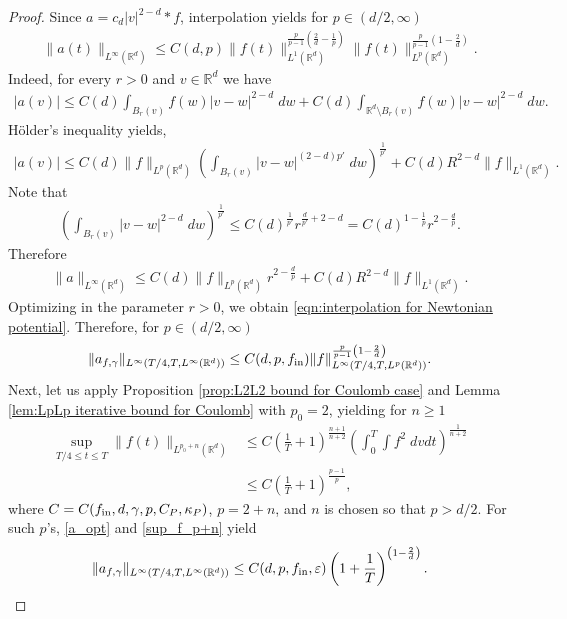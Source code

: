\documentclass[12pt,american]{amsart}
\numberwithin{equation}{section}
\theoremstyle{plain}
\theoremstyle{definition}                  %
\def\fin{f_{\textnormal{in}}}
\begin{document}
\begin{proof}
  Since $a = c_d|v|^{2-d} * f$, interpolation yields for $p\in (d/2,\infty)$
  \begin{align}\label{eqn:interpolation for Newtonian potential}
    \|a(t)\|_{L^\infty(\mathbb{R}^d)} \leq C(d,p)\|f(t)\|_{L^1(\mathbb{R}^d)}^{\frac{p}{p-1}\left ( \frac{2}{d}-\frac{1}{p} \right )}\|f(t)\|_{L^p(\mathbb{R}^d)}^{\frac{p}{p-1}\left ( 1- \frac{2}{d} \right )}.	
  \end{align}	
  Indeed, for every $r>0$ and $v\in \mathbb{R}^d$ we have
  \begin{align*}	
    |a(v)|\leq C(d)\int_{B_r(v)}f(w)|v-w|^{2-d}\;dw +C(d)\int_{\mathbb{R}^d\setminus B_r(v)}f(w)|v-w|^{2-d}\;dw	.
  \end{align*}	
  H\"older's inequality yields,	
  \begin{align*}	
    |a(v)|\leq C(d) \|f\|_{L^p(\mathbb{R}^d)}\left (\int_{B_r(v)}|v-w|^{(2-d)p'}\;dw\right )^{\frac{1}{p'}}+C(d) R^{2-d}\|f\|_{L^1(\mathbb{R}^d)}	.
  \end{align*}	
  Note that
  \begin{align*}
    \left (\int_{B_r(v)}|v-w|^{2-d}\;dw\right )^{\frac{1}{p'}} \leq C(d)^{\frac{1}{p'}}r^{\frac{d}{p'}+2-d} = C(d)^{1-\frac{1}{p}}r^{2-\frac{d}{p}}.
  \end{align*}	
  Therefore
  \begin{align*}	
    \|a\|_{L^\infty(\mathbb{R}^d)} \leq C(d) \|f\|_{L^p(\mathbb{R}^d)}r^{2-\frac{d}{p}}+C(d) R^{2-d}\|f\|_{L^1(\mathbb{R}^d)}	.
  \end{align*}
  Optimizing in the parameter $r>0$, we obtain \eqref{eqn:interpolation for Newtonian potential}. Therefore, for $p\in(d/2,\infty)$
  \begin{align}\label{a_opt}
    \|a_{f,\gamma}\|_{L^\infty(T/4,T,L^\infty(\mathbb{R}^d))}\le C(d,p,\fin)\|f\|_{L^\infty(T/4,T,L^p(\mathbb{R}^d))}^{\frac{p}{p-1}\left( 1-\frac{2}{d} \right )}.
  \end{align}
  Next, let us apply Proposition \ref{prop:L2L2 bound for Coulomb case} and Lemma \ref{lem:LpLp iterative bound for Coulomb} with $p_0=2$, yielding for $n\geq 1$ 
 \begin{align}\label{sup_f_p+n}
   \sup \limits_{T/4\leq t\leq T}  \|f(t)\|_{L^{p_0+n}(\mathbb{R}^d)} &\leq C\left (\frac{1}{T}+1 \right )^{\frac{n+1}{n+2}}\left (\int_{0}^T\int f^{2}\;dvdt \right )^{\frac{1}{n+2}} \nonumber \\
  & \leq C\left (\frac{1}{T}+1 \right )^{\frac{p-1}{p}},
  \end{align}	
   where $C = C(\fin,d,\gamma,p,C_P,\kappa_P)$, $p=2+n$, and $n$ is chosen so that $p>d/2$. For such $p$'s, \eqref{a_opt} and \eqref{sup_f_p+n} yield
  \begin{align*}
    \|a_{f,\gamma}\|_{L^\infty(T/4,T,L^\infty(\mathbb{R}^d))}\leq C(d,p,\fin,\varepsilon)\left ( 1 + \frac{1}{T} \right )^{\left( 1-\frac{2}{d} \right )}.
  \end{align*}
 
\end{proof}
\end{document}
